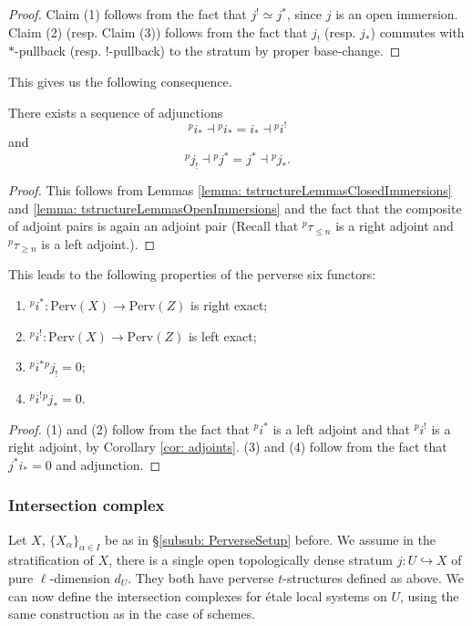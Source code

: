 \documentclass[letterpaper,11pt]{amsart}
\begin{document}
\begin{proof}
Claim (1) follows from the fact that $j^{!} \simeq j^\ast$, since $j$ is an open immersion. Claim (2) (resp. Claim (3)) follows from the fact that $j_{!}$ (resp. $j_\ast$) commutes with $*$-pullback (resp. $!$-pullback) to the stratum by proper base-change.
\end{proof}
This gives us the following consequence. 
\begin{corollary}{\label{cor: adjoints}}
There exists a sequence of adjunctions 
\[ \phantom{}^{p}i_\ast \dashv \phantom{}^{p}i_\ast = i_\ast \dashv \phantom{}^{p}i^{!} \]
and 
\[ \phantom{}^{p}j_{!} \dashv \phantom{}^{p}j^\ast = j^\ast \dashv \phantom{}^{p}j_\ast. \]
\end{corollary}
\begin{proof}
This follows from Lemmas \ref{lemma: tstructureLemmasClosedImmersions} and \ref{lemma: tstructureLemmasOpenImmersions} and the fact that the composite of adjoint pairs is again an adjoint pair (Recall that  $\phantom{}^{p}\tau_{\leq n}$ is a right adjoint and $\phantom{}^{p}\tau_{\geq n}$ is a left adjoint.). 
\end{proof}
This leads to the following properties of the perverse six functors:
\begin{lemma}{\label{lemma: KeyPropertiesofOpenandClosedTstructures}}
\begin{enumerate}
    \item $\phantom{}^pi^\ast: \mathrm{Perv}(X)\to \mathrm{Perv}(Z)$ is right exact;
    \item $\phantom{}^pi^!: \mathrm{Perv}(X)\to \mathrm{Perv}(Z)$ is left exact;
    \item $\phantom{}^pi^\ast \phantom{}^pj_!=0$;
    \item $\phantom{}^pi^! \phantom{}^pj_\ast=0$.
\end{enumerate}
\end{lemma}
\begin{proof}
(1) and (2) follow from the fact that $\phantom{}^pi^\ast$ is a left adjoint and that $\phantom{}^pi^!$ is a right adjoint, by Corollary \ref{cor: adjoints}. (3) and (4) follow from the fact that $j^\ast i_\ast =0$ and adjunction.
\end{proof}

\subsubsection{Intersection complex}\label{subsub: IC}
Let $X$, $\{X_\alpha\}_{\alpha\in I}$ be as in \S \ref{subsub: PerverseSetup} before. We assume in the stratification of $X$, there is a single open topologically dense stratum $j: U\hookrightarrow X$ of pure $\ell$-dimension $d_U$. They both have perverse $t$-structures defined as above. We can now define the intersection complexes for \'etale local systems on $U$, using the same construction as in the case of schemes. 
\end{document}
